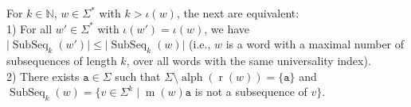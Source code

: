 \documentclass[runningheads,UKenglish,cleveref, autoref, thm-restate]{llncs}
\newcommand{\N}{\mathbb{N}}
\def\ta{\mathtt{a}}
\def\r{\operatorname{r}}
\def\m{\operatorname{m}}
\DeclareMathOperator{\al}{alph}
\DeclareMathOperator\ScatFact{SubSeq}
\begin{document}
\begin{proposition}\label{corollary:min-absent-sf-main-property}
    For $k\in\N$, $w \in \Sigma^*$ with $k > \iota(w)$, the next are equivalent:\\
    1) For all  $w' \in \Sigma^*$  with $\iota(w')=\iota(w)$, we have $\vert \ScatFact_k(w') \vert \leq \vert \ScatFact_k(w) \vert$ (i.e., $w$ is a word with a maximal number of subsequences of length $k$, over all words with the same universality index).\\
    2) There exists $\ta\in \Sigma$ such that $\Sigma \setminus \al(\r(w))=\{\ta\}$  and $\ScatFact_k(w)=\{v\in \Sigma^k\mid \m(w)\ta$ is not a subsequence of $v\}$.
    
    
%     
%     
%     
%     

    
\end{proposition}
\end{document}

